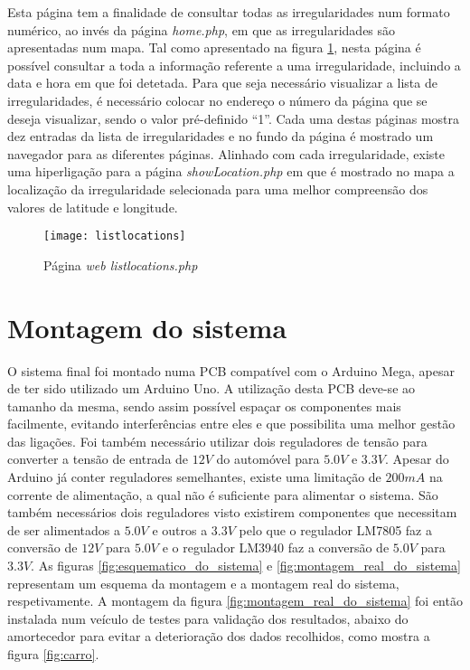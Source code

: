 Esta página tem a finalidade de consultar todas as irregularidades num formato numérico, ao invés da página \emph{home.php}, em que as irregularidades são apresentadas num mapa.
Tal como apresentado na figura \ref{fig:listlocations.php}, nesta página é possível consultar a toda a informação referente a uma irregularidade, incluindo a data e hora em que foi detetada.
Para que seja necessário visualizar a lista de irregularidades, é necessário colocar no endereço o número da página que se deseja visualizar, sendo o valor pré-definido “1”.
Cada uma destas páginas mostra dez entradas da lista de irregularidades e no fundo da página é mostrado um navegador para as diferentes páginas. 
Alinhado com cada irregularidade, existe uma hiperligação para a página \emph{showLocation.php} em que é mostrado no mapa a localização da irregularidade selecionada para uma melhor compreensão dos valores de latitude e longitude.

\begin{figure}[htbp]
	\centering
	\texttt{[image: listlocations]}
	\caption{Página \emph{web listlocations.php}}
	\label{fig:listlocations.php}
\end{figure}

\section{Montagem do sistema}
\label{sec:montagem_do_sistema}

O sistema final foi montado numa PCB compatível com o Arduino Mega, apesar de ter sido utilizado um Arduino Uno.
A utilização desta PCB deve-se ao tamanho da mesma, sendo assim possível espaçar os componentes mais facilmente, evitando interferências entre eles e que possibilita uma melhor gestão das ligações.
Foi também necessário utilizar dois reguladores de tensão para converter a tensão de entrada de $12 V$ do automóvel para $5.0 V$ e $3.3 V$.
Apesar do Arduino já conter reguladores semelhantes, existe uma limitação de $200 mA$ na corrente de alimentação, a qual não é suficiente para alimentar o sistema.
São também necessários dois reguladores visto existirem componentes que necessitam de ser alimentados a $5.0 V$ e outros a $3.3 V$ pelo que o regulador LM7805 faz a conversão de $12 V$ para $5.0 V$ e o regulador LM3940 faz a conversão de $5.0 V$ para $3.3 V$.
As figuras \ref{fig:esquematico_do_sistema} e \ref{fig:montagem_real_do_sistema} representam um esquema da montagem e a montagem real do sistema, respetivamente.
A montagem da figura \ref{fig:montagem_real_do_sistema} foi então instalada num veículo de testes para validação dos resultados, abaixo do amortecedor para evitar a deterioração dos dados recolhidos, como mostra a figura \ref{fig:carro}.

